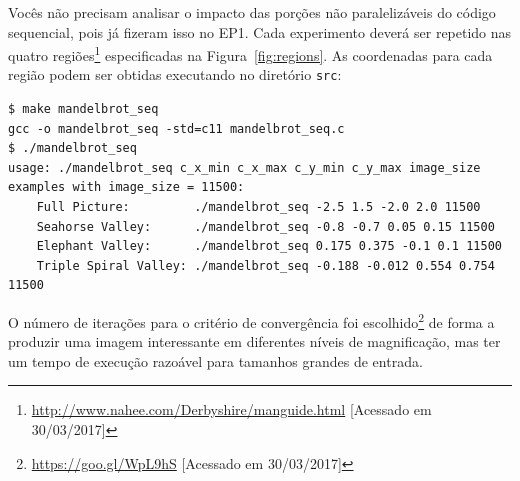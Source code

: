 \documentclass[final,12pt,a4paper]{elsarticle}
\begin{document}
Vocês não precisam analisar o impacto das porções não paralelizáveis do
código sequencial, pois já fizeram isso no EP1.
Cada experimento deverá ser repetido nas quatro
regiões\footnote{\url{http://www.nahee.com/Derbyshire/manguide.html} [Acessado
em 30/03/2017]} especificadas na Figura~\ref{fig:regions}. As coordenadas para
cada região podem ser obtidas executando no diretório \texttt{src}:

\begin{lstlisting}
$ make mandelbrot_seq
gcc -o mandelbrot_seq -std=c11 mandelbrot_seq.c
$ ./mandelbrot_seq
usage: ./mandelbrot_seq c_x_min c_x_max c_y_min c_y_max image_size
examples with image_size = 11500:
    Full Picture:         ./mandelbrot_seq -2.5 1.5 -2.0 2.0 11500
    Seahorse Valley:      ./mandelbrot_seq -0.8 -0.7 0.05 0.15 11500
    Elephant Valley:      ./mandelbrot_seq 0.175 0.375 -0.1 0.1 11500
    Triple Spiral Valley: ./mandelbrot_seq -0.188 -0.012 0.554 0.754 11500
\end{lstlisting}

O número de iterações para o critério de convergência foi
escolhido\footnote{\url{https://goo.gl/WpL9hS} [Acessado em 30/03/2017]} de
forma a produzir uma imagem interessante em diferentes níveis de magnificação,
mas ter um tempo de execução razoável para tamanhos grandes de entrada.
\end{document}
